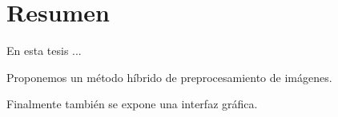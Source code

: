 \newpage 
{}
\chapter*{Resumen}

En esta tesis ...

Proponemos un método híbrido de preprocesamiento de imágenes.

Finalmente también se expone una interfaz gráfica.
